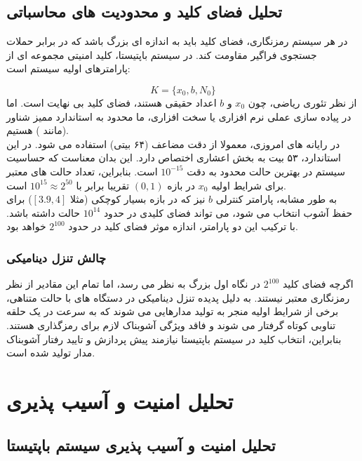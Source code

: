 \documentclass[12pt]{report}
\begin{document}
\newpage

\section{تحلیل فضای کلید و محدودیت های محاسباتی}
در هر سیستم رمزنگاری، فضای کلید باید به اندازه ای بزرگ باشد که در برابر 
حملات جستجوی فراگیر مقاومت کند. در سیستم باپتیستا، کلید امنیتی 
مجموعه ای از پارامترهای اولیه سیستم است:

\begin{equation}
    K = \{x_0, b, N_0\}
\end{equation}
\noindent
از نظر تئوری ریاضی، چون $x_0$ و $b$ اعداد حقیقی هستند، فضای کلید بی نهایت است. اما در پیاده سازی 
عملی نرم افزاری یا سخت افزاری، ما محدود به استاندارد ممیز شناور 
(مانند ) هستیم. 
\\\noindent
در رایانه های امروزی، معمولا از دقت مضاعف (۶۴ بیتی) استفاده 
می شود. در این استاندارد، ۵۳ بیت به بخش اعشاری اختصاص دارد. این بدان معناست که حساسیت سیستم در 
بهترین حالت محدود به دقت $10^{-15}$ است. بنابراین، تعداد حالت های معتبر برای شرایط اولیه $x_0$ 
در بازه $(0, 1)$ تقریبا برابر با $10^{15} \approx 2^{50}$ است.
\\\noindent
به طور مشابه، پارامتر کنترلی $b$ نیز که در بازه بسیار کوچکی (مثلا $[3.9, 4]$) برای حفظ آشوب 
انتخاب می شود، می تواند فضای کلیدی در حدود $10^{14}$ حالت داشته باشد. با ترکیب این دو پارامتر، 
اندازه موثر فضای کلید در حدود $2^{100}$ خواهد بود. 

\subsection{چالش تنزل دینامیکی}
اگرچه فضای کلید $2^{100}$ در نگاه اول بزرگ به نظر می رسد، اما تمام این مقادیر از نظر رمزنگاری 
معتبر نیستند. به دلیل پدیده تنزل دینامیکی در دستگاه های 
با حالت متناهی، برخی از شرایط اولیه منجر به تولید مدارهایی می شوند که به سرعت در یک حلقه تناوبی 
کوتاه گرفتار می شوند و فاقد ویژگی آشوبناک لازم برای رمزگذاری هستند. بنابراین، انتخاب کلید در 
سیستم باپتیستا نیازمند پیش پردازش و تایید رفتار آشوبناک مدار تولید شده است.

\chapter{تحلیل امنیت و آسیب پذیری}

\section{تحلیل امنیت و آسیب پذیری سیستم باپتیستا}
\end{document}
